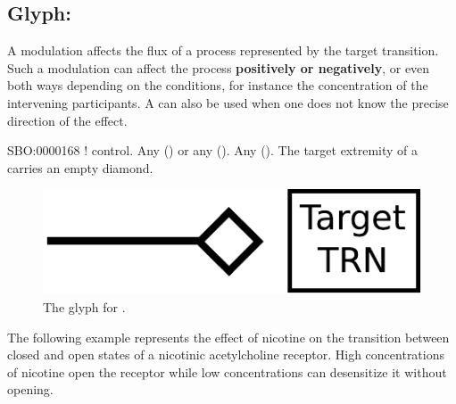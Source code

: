 \subsection{Glyph: }\label{sec:modulation}

A modulation affects the flux of a process
represented by the target transition. Such a modulation can affect the
process \textbf{positively or negatively}, or even both ways depending on the
conditions, for instance the concentration of the intervening
participants. A  can also be used when one does not know the precise direction of the effect.

\begin{glyphDescription}
 \glyphSboTerm SBO:0000168 ! control.
 \glyphOrigin Any  () or any  ().
 \glyphTarget Any  ().
 \glyphEndPoint The target extremity of a  carries an empty diamond.
 \end{glyphDescription}

\begin{figure}[H]
  \centering
  \includegraphics[scale = 0.5]{images/modulation}
  \caption{The \PD glyph for .}
  \label{fig:modulation}
\end{figure}

The following example represents the effect of nicotine on the transition between closed and open states of a nicotinic acetylcholine receptor. High concentrations of nicotine open the receptor while low concentrations can desensitize it without opening. 

